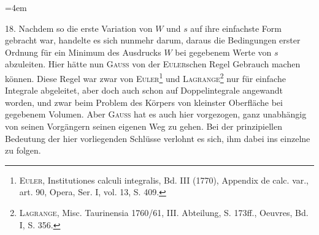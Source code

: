 \clearpage\begingroup
\emergencystretch=4em\relax\NoSourceHead{}
\makeatletter\tagsleft@true\let\veqno\@@leqno\makeatother
\renewcommand{\thefootnote}{\arabic{footnote})}\setcounter{footnote}{47}
\newcommand{\BolzaVerticalNotEqual}{\mathrel{\vcenter{\hbox{\begin{tikzpicture}[x=1em,y=1ex,line width=.05em]
\draw(0,.18)--(.68,.18);\draw(0,-.18)--(.68,-.18);\draw(.34,-.6)--(.34,.6);
\end{tikzpicture}}}}}
\begin{center}\end{center}
\noindent\hspace*{\parindent}18. Nachdem so die erste Variation von $W$ und $s$ auf ihre einfachste
Form gebracht war, handelte es sich nunmehr darum, daraus die Bedingungen
erster Ordnung für ein Minimum des Ausdrucks $W$ bei gegebenem Werte von
$s$ abzuleiten. Hier hätte nun \textsc{Gauss} von der \textsc{Euler}schen Regel Gebrauch
machen können. Diese Regel war zwar von \textsc{Euler}\footnote{\textsc{Euler}, Institutiones calculi integralis, Bd. III (1770), Appendix de calc. var., art. 90, Opera,
Ser. I, vol. 13, S. 409.} und \textsc{Lagrange}\footnote{\textsc{Lagrange}, Misc. Taurinensia 1760/61, III. Abteilung, S. 173ff., Oeuvres, Bd. I, S. 356.} nur für
einfache Integrale abgeleitet, aber doch auch schon auf Doppelintegrale angewandt
worden, und zwar beim Problem des Körpers von kleinster Oberfläche
bei gegebenem Volumen. Aber \textsc{Gauss} hat es auch hier vorgezogen, ganz
unabhängig von seinen Vorgängern seinen eigenen Weg zu gehen. Bei der
prinzipiellen Bedeutung der hier vorliegenden Schlüsse verlohnt es sich, ihm
dabei ins einzelne zu folgen.

